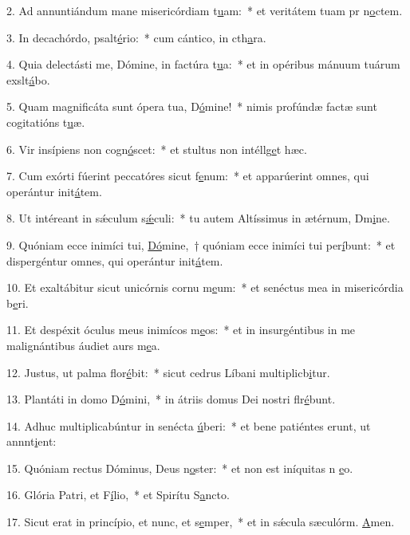 2. Ad annuntiándum mane misericórdiam t\uline{u}am:~* et veritátem tuam pr n\uline{o}ctem.\par 
3. In decachórdo, psalt\uline{é}rio:~* cum cántico, in cth\uline{a}ra.\par 
4. Quia delectásti me, Dómine, in factúra t\uline{u}a:~* et in opéribus mánuum tuárum exslt\uline{á}bo.\par 
5. Quam magnificáta sunt ópera tua, D\uline{ó}mine!~* nimis profúndæ factæ sunt cogitatións t\uline{u}æ.\par 
6. Vir insípiens non cogn\uline{ó}scet:~* et stultus non intéllg\uline{e}t hæc.\par 
7. Cum exórti fúerint peccatóres sicut f\uline{e}num:~* et apparúerint omnes, qui operántur init\uline{á}tem.\par 
8. Ut intéreant in sǽculum s\uline{ǽ}culi:~* tu autem Altíssimus in ætérnum, Dm\uline{i}ne.\par 
9. Quóniam ecce inimíci tui, \uline{Dó}mine,~† quóniam ecce inimíci tui per\uline{í}bunt:~* et dispergéntur omnes, qui operántur init\uline{á}tem.\par 
10. Et exaltábitur sicut unicórnis cornu m\uline{e}um:~* et senéctus mea in misericórdia b\uline{e}ri.\par 
11. Et despéxit óculus meus inimícos m\uline{e}os:~* et in insurgéntibus in me malignántibus áudiet aurs m\uline{e}a.\par 
12. Justus, ut palma flor\uline{é}bit:~* sicut cedrus Líbani multiplicb\uline{i}tur.\par 
13. Plantáti in domo D\uline{ó}mini,~* in átriis domus Dei nostri flr\uline{é}bunt.\par 
14. Adhuc multiplicabúntur in senécta \uline{ú}beri:~* et bene patiéntes erunt, ut annnt\uline{i}ent:\par 
15. Quóniam rectus Dóminus, Deus n\uline{o}ster:~* et non est iníquitas n \uline{e}o.\par 
16. Glória Patri, et F\uline{í}lio,~* et Spirítu S\uline{a}ncto.\par 
17. Sicut erat in princípio, et nunc, et s\uline{e}mper,~* et in sǽcula sæculórm. \uline{A}men.\par 
